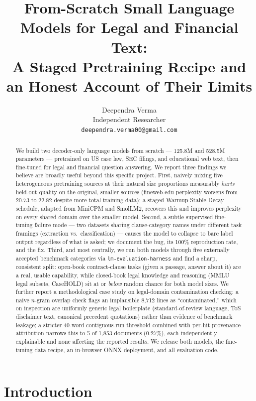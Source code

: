 \documentclass[11pt]{article}
\title{\textbf{From-Scratch Small Language Models for Legal and Financial Text:\\
A Staged Pretraining Recipe and an Honest Account of Their Limits}}
\author{Deependra Verma \\
Independent Researcher \\
\texttt{deependra.verma00@gmail.com}}
\date{}
\begin{document}
\maketitle

\begin{abstract}
We build two decoder-only language models from scratch --- 125.8M and 528.5M
parameters --- pretrained on US case law, SEC filings, and educational web
text, then fine-tuned for legal and financial question answering. We report
three findings we believe are broadly useful beyond this specific project.
First, naively mixing five heterogeneous pretraining sources at their natural
size proportions measurably \emph{hurts} held-out quality on the original,
smaller sources (fineweb-edu perplexity worsens from 20.73 to 22.82 despite
more total training data); a staged Warmup-Stable-Decay schedule, adapted
from MiniCPM and SmolLM2, recovers this and improves perplexity on every
shared domain over the smaller model. Second, a subtle supervised
fine-tuning failure mode --- two datasets sharing clause-category names
under different task framings (extraction vs.\ classification) --- causes
the model to collapse to bare label output regardless of what is asked;
we document the bug, its 100\% reproduction rate, and the fix. Third, and
most centrally, we run both models through five externally accepted
benchmark categories via \texttt{lm-evaluation-harness}
\citep{eval-harness} and find a sharp, consistent split: open-book
contract-clause tasks (given a passage, answer about it) are a real,
usable capability, while closed-book legal knowledge and reasoning
(MMLU legal subsets, CaseHOLD) sit at or \emph{below} random chance for
both model sizes. We further report a methodological case study on
legal-domain contamination checking: a naive $n$-gram overlap check flags
an implausible 8{,}712 lines as ``contaminated,'' which on inspection are
uniformly generic legal boilerplate (standard-of-review language, ToS
disclaimer text, canonical precedent quotations) rather than evidence of
benchmark leakage; a stricter 40-word contiguous-run threshold combined
with per-hit provenance attribution narrows this to 5 of 1{,}853 documents
(0.27\%), each independently explainable and none affecting the reported
results. We release both models, the fine-tuning data recipe, an
in-browser ONNX deployment, and all evaluation code.
\end{abstract}

\section{Introduction}
\end{document}
